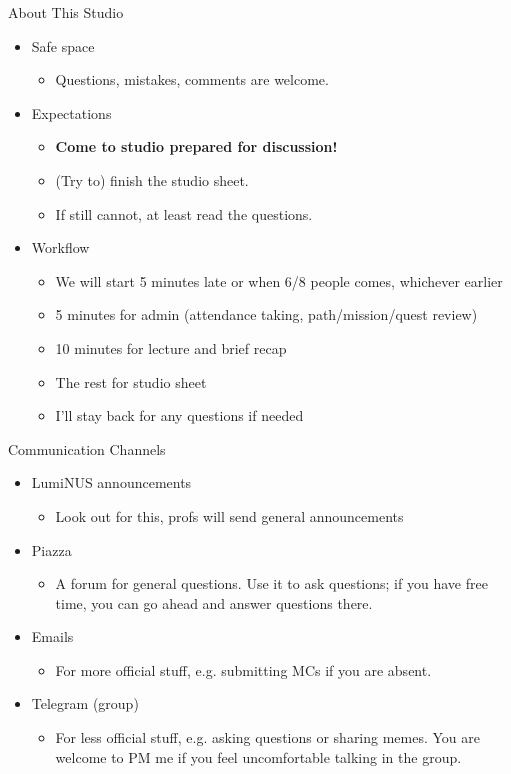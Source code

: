 \documentclass[10pt]{beamer}
\begin{document}
\begin{frame}[fragile]{About This Studio}
\begin{itemize}
  \item Safe space
  \begin{itemize}
    \item Questions, mistakes, comments are welcome.
  \end{itemize}
  \item Expectations
  \begin{itemize}
    \item \textbf{Come to studio prepared for discussion!}
    \item (Try to) finish the studio sheet.
    \item If still cannot, at least read the questions. 
  \end{itemize}
  \item Workflow
  \begin{itemize}
    \item We will start 5 minutes late or when 6/8 people comes, whichever earlier
    \item 5 minutes for admin (attendance taking, path/mission/quest review)
    \item 10 minutes for lecture and brief recap
    \item The rest for studio sheet
    \item I'll stay back for any questions if needed
  \end{itemize}
\end{itemize} 
\end{frame}


\begin{frame}[fragile]{Communication Channels}
  \begin{itemize}
    \item LumiNUS announcements
    \begin{itemize}
      \item Look out for this, profs will send general announcements
    \end{itemize}
    \item Piazza
    \begin{itemize}
      \item A forum for general questions. Use it to ask questions; if you have free time, you can go ahead and answer questions there.
    \end{itemize}
    \item Emails
    \begin{itemize}
      \item For more official stuff, e.g. submitting MCs if you are absent.
    \end{itemize}
    \item Telegram (group)
    \begin{itemize}
      \item For less official stuff, e.g. asking questions or sharing memes. You are welcome to PM me if you feel uncomfortable talking in the group.
    \end{itemize}
  \end{itemize}
\end{frame}
\end{document}
